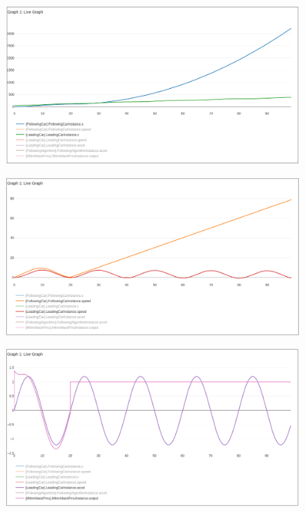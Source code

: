 \begin{figure}[H]
	\centering
	\includegraphics[width=\textwidth]{img/AttackAccel1X.png}
	\caption{}
\end{figure}

\begin{figure}[H]
	\centering
	\includegraphics[width=\textwidth]{img/AttackAccel1Speed.png}
	\caption{}
\end{figure}

\begin{figure}[H]
	\centering
	\includegraphics[width=\textwidth]{img/AttackAccel1Accel.png}
	\caption{}
\end{figure}

